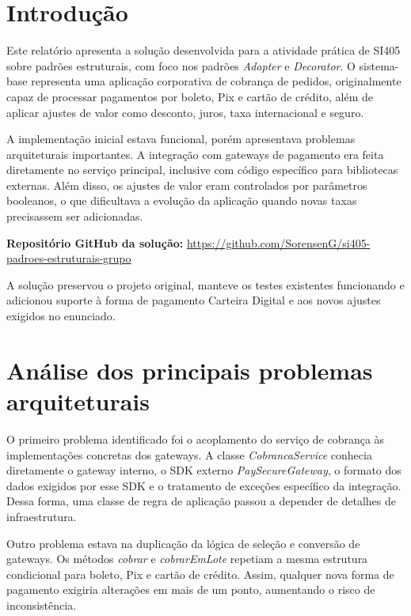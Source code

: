 \documentclass[12pt,a4paper]{article}
\begin{document}
\setcounter{page}{1}


\section{Introdução}

Este relatório apresenta a solução desenvolvida para a atividade prática de SI405 sobre padrões estruturais, com foco nos padrões \textit{Adapter} e \textit{Decorator}. O sistema-base representa uma aplicação corporativa de cobrança de pedidos, originalmente capaz de processar pagamentos por boleto, Pix e cartão de crédito, além de aplicar ajustes de valor como desconto, juros, taxa internacional e seguro.

A implementação inicial estava funcional, porém apresentava problemas arquiteturais importantes. A integração com gateways de pagamento era feita diretamente no serviço principal, inclusive com código específico para bibliotecas externas. Além disso, os ajustes de valor eram controlados por parâmetros booleanos, o que dificultava a evolução da aplicação quando novas taxas precisassem ser adicionadas.

\begin{resultbox}
\textbf{Repositório GitHub da solução:} \url{https://github.com/SorensenG/si405-padroes-estruturais-grupo}
\end{resultbox}

A solução preservou o projeto original, manteve os testes existentes funcionando e adicionou suporte à forma de pagamento Carteira Digital e aos novos ajustes exigidos no enunciado.

\section{Análise dos principais problemas arquiteturais}

O primeiro problema identificado foi o acoplamento do serviço de cobrança às implementações concretas dos gateways. A classe \textit{CobrancaService} conhecia diretamente o gateway interno, o SDK externo \textit{PaySecureGateway}, o formato dos dados exigidos por esse SDK e o tratamento de exceções específico da integração. Dessa forma, uma classe de regra de aplicação passou a depender de detalhes de infraestrutura.

Outro problema estava na duplicação da lógica de seleção e conversão de gateways. Os métodos \textit{cobrar} e \textit{cobrarEmLote} repetiam a mesma estrutura condicional para boleto, Pix e cartão de crédito. Assim, qualquer nova forma de pagamento exigiria alterações em mais de um ponto, aumentando o risco de inconsistência.
\end{document}
